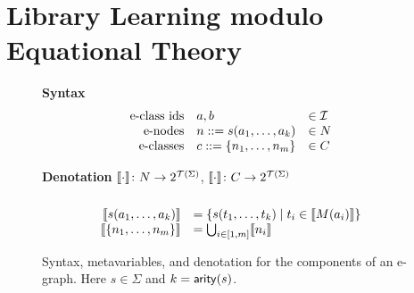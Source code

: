 \section{Library Learning modulo Equational Theory}\label{sec:egraphs}

\begin{figure}
  \begin{minipage}{.5\textwidth}
    \textbf{Syntax}
    $$
    \begin{array}{rll}
      \text{e-class ids} & a,b &\in \mathcal{I} \\
      \text{e-nodes}     & n \mathrel{\mathord{:}\mathord{:=}} s(a_1, \ldots, a_k)  &\in N\\
      \text{e-classes}   & c \mathrel{\mathord{:}\mathord{:=}} \{n_1, \ldots, n_m\} &\in C     
    \end{array}
    $$      
  \end{minipage}%
  \begin{minipage}{.5\textwidth}
    \textbf{Denotation} $\llbracket \cdot \rrbracket\colon N\to 2^{\mathcal{T}(\Sigma)}$, $\llbracket \cdot \rrbracket\colon C\to 2^{\mathcal{T}(\Sigma)}$
    $$
    \begin{array}{rl}
      \\
      \llbracket s(a_1, \ldots, a_k) \rrbracket &= \{s(t_1, \ldots, t_k) \mid t_i \in \llbracket M(a_i) \rrbracket\}\\
      \llbracket \{n_1, \ldots, n_m\} \rrbracket &= \bigcup_{i \in [1,m]} \llbracket n_i \rrbracket
    \end{array}
    $$      
  \end{minipage}
  \caption{Syntax, metavariables, and denotation for the components of an e-graph.
           Here $s \in \Sigma$ and $k = \mathsf{arity}(s)$.}\label{fig:syntax}
\end{figure}


